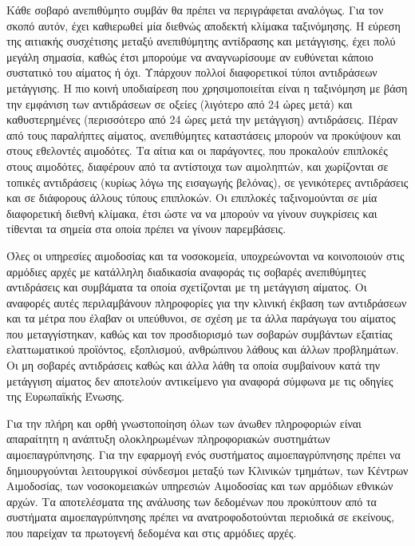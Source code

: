  	Κάθε σοβαρό ανεπιθύμητο συμβάν θα πρέπει να περιγράφεται αναλόγως. Για τον σκοπό αυτόν, έχει καθιερωθεί μία διεθνώς αποδεκτή κλίμακα ταξινόμησης. Η εύρεση της αιτιακής συσχέτισης μεταξύ ανεπιθύμητης αντίδρασης και μετάγγισης, έχει πολύ μεγάλη σημασία, καθώς έτσι μπορούμε να αναγνωρίσουμε αν ευθύνεται κάποιο συστατικό του αίματος ή όχι. Υπάρχουν πολλοί διαφορετικοί τύποι αντιδράσεων μετάγγισης. Η πιο κοινή υποδιαίρεση που χρησιμοποιείται είναι η ταξινόμηση με βάση την εμφάνιση των αντιδράσεων σε οξείες (λιγότερο από 24 ώρες μετά) και καθυστερημένες (περισσότερο από 24 ώρες μετά την μετάγγιση) αντιδράσεις. Πέραν από τους παραλήπτες αίματος, ανεπιθύμητες καταστάσεις μπορούν να προκύψουν και στους εθελοντές αιμοδότες. Τα αίτια και οι παράγοντες, που προκαλούν επιπλοκές στους αιμοδότες, διαφέρουν από τα αντίστοιχα των αιμοληπτών, και χωρίζονται σε τοπικές αντιδράσεις (κυρίως λόγω της εισαγωγής βελόνας), σε γενικότερες αντιδράσεις και σε διάφορους άλλους τύπους επιπλοκών. Οι επιπλοκές ταξινομούνται σε μία διαφορετική διεθνή κλίμακα, έτσι ώστε να να μπορούν να γίνουν συγκρίσεις και τίθενται τα σημεία στα οποία πρέπει να γίνουν παρεμβάσεις. 
 	
		Όλες οι υπηρεσίες αιμοδοσίας και τα νοσοκομεία, υποχρεώνονται να κοινοποιούν στις αρμόδιες αρχές με κατάλληλη διαδικασία αναφοράς τις σοβαρές ανεπιθύμητες αντιδράσεις και συμβάματα τα οποία σχετίζονται με τη μετάγγιση αίματος. Οι αναφορές αυτές περιλαμβάνουν πληροφορίες για την κλινική έκβαση των αντιδράσεων και τα μέτρα που έλαβαν οι υπεύθυνοι, σε σχέση με τα άλλα παράγωγα του αίματος που μεταγγίστηκαν, καθώς και τον προσδιορισμό των σοβαρών συμβάντων εξαιτίας ελαττωματικού προϊόντος, εξοπλισμού, ανθρώπινου λάθους και άλλων προβλημάτων.\cite{cite-revekka} Οι μη σοβαρές αντιδράσεις καθώς και άλλα λάθη τα οποία συμβαίνουν κατά την μετάγγιση αίματος δεν αποτελούν αντικείμενο για αναφορά σύμφωνα με τις οδηγίες της Ευρωπαϊκής Ένωσης.
		
		Για την πλήρη και ορθή γνωστοποίηση όλων των άνωθεν πληροφοριών είναι απαραίτητη η ανάπτυξη ολοκληρωμένων πληροφοριακών συστημάτων αιμοεπαγρύπνησης. Για την εφαρμογή ενός συστήματος αιμοεπαγρύπνησης πρέπει να δημιουργούνται λειτουργικοί σύνδεσμοι μεταξύ των Κλινικών τμημάτων, των Κέντρων Αιμοδοσίας, των νοσοκομειακών υπηρεσιών Αιμοδοσίας και των αρμόδιων εθνικών αρχών. Τα αποτελέσματα της ανάλυσης των δεδομένων που προκύπτουν από τα συστήματα αιμοεπαγρύπνησης πρέπει να ανατροφοδοτούνται περιοδικά σε εκείνους, που παρείχαν τα πρωτογενή δεδομένα και στις αρμόδιες αρχές.
		
